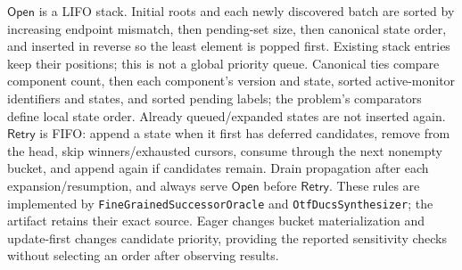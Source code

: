 $\mathsf{Open}$ is a LIFO stack. Initial roots and each newly discovered batch are sorted by increasing endpoint mismatch, then pending-set size, then canonical state order, and inserted in reverse so the least element is popped first. Existing stack entries keep their positions; this is not a global priority queue. Canonical ties compare component count, then each component's version and state, sorted active-monitor identifiers and states, and sorted pending labels; the problem's comparators define local state order. Already queued/expanded states are not inserted again. $\mathsf{Retry}$ is FIFO: append a state when it first has deferred candidates, remove from the head, skip winners/exhausted cursors, consume through the next nonempty bucket, and append again if candidates remain. Drain propagation after each expansion/resumption, and always serve $\mathsf{Open}$ before $\mathsf{Retry}$. These rules are implemented by \texttt{FineGrainedSuccessorOracle} and \texttt{OtfDucsSynthesizer}; the artifact retains their exact source. Eager changes bucket materialization and update-first changes candidate priority, providing the reported sensitivity checks without selecting an order after observing results.
